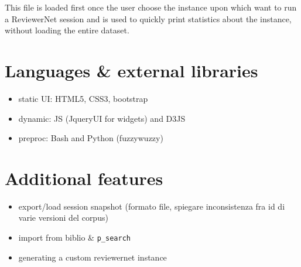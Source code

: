 This file is loaded first once the user choose the instance upon which want to run a ReviewerNet session and is used to quickly print statistics about the instance, without loading the entire dataset.
\section{Languages \& external libraries}
\label{sec:lang}
\begin{itemize}
    \item static UI: HTML5, CSS3, bootstrap
    \item dynamic: JS (JqueryUI for widgets) and D3JS
    \item preproc: Bash and Python (fuzzywuzzy) 
\end{itemize}

\section{Additional features}
\label{sec:misccode}

\begin{itemize}
    \item export/load session snapshot (formato file, spiegare inconsistenza fra id di varie versioni del corpus)
    \item import from biblio \& \texttt{p\_search}
    \item generating a custom reviewernet instance
\end{itemize}